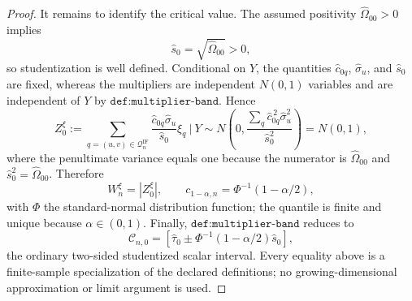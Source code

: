 \documentclass{article}
\begin{document}
\begin{proof}
It remains to identify the critical value.  The assumed positivity
\(\widehat\Omega_{00}>0\) implies
\[
\widehat s_0=\sqrt{\widehat\Omega_{00}}>0,
\]
so studentization is well defined.  Conditional on \(Y\), the quantities
\(\widehat c_{0q}\), \(\widehat\sigma_u\), and \(\widehat s_0\) are fixed,
whereas the multipliers are independent \(N(0,1)\) variables and are
independent of \(Y\) by \(\texttt{def:multiplier-band}\).  Hence
\[
Z_0^\xi
:=\sum_{q=(u,v)\in\mathcal Q_n^{\mathrm{IF}}}
  \frac{\widehat c_{0q}\widehat\sigma_u}{\widehat s_0}\xi_q
\ \bigg|\ Y
\sim N\!\left(
0,
\frac{\sum_q\widehat c_{0q}^{\,2}\widehat\sigma_u^2}
     {\widehat s_0^2}
\right)
=N(0,1),
\]
where the penultimate variance equals one because the numerator is
\(\widehat\Omega_{00}\) and
\(\widehat s_0^2=\widehat\Omega_{00}\).  Therefore
\[
W_n^\xi=|Z_0^\xi|,
\qquad
c_{1-\alpha,n}=\Phi^{-1}(1-\alpha/2),
\]
with \(\Phi\) the standard-normal distribution function; the quantile is
finite and unique because \(\alpha\in(0,1)\).  Finally,
\(\texttt{def:multiplier-band}\) reduces to
\[
\mathcal C_{n,0}
=\left[
\widehat\tau_0
\pm \Phi^{-1}(1-\alpha/2)\widehat s_0
\right],
\]
the ordinary two-sided studentized scalar interval.  Every equality above is
a finite-sample specialization of the declared definitions; no
growing-dimensional approximation or limit argument is used.
\end{proof}
\end{document}
